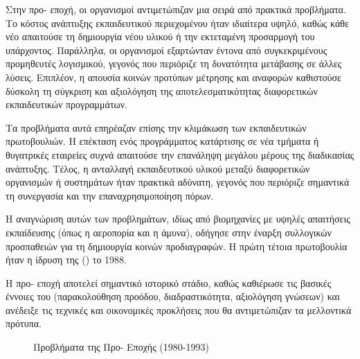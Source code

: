 Στην προ- εποχή, οι οργανισμοί αντιμετώπιζαν μια σειρά από πρακτικά προβλήματα. Το κόστος ανάπτυξης εκπαιδευτικού περιεχομένου ήταν ιδιαίτερα υψηλό, καθώς κάθε νέο  απαιτούσε τη δημιουργία νέου υλικού ή την εκτεταμένη προσαρμογή του υπάρχοντος. Παράλληλα, οι οργανισμοί εξαρτώνταν έντονα από συγκεκριμένους προμηθευτές λογισμικού, γεγονός που περιόριζε τη δυνατότητα μετάβασης σε άλλες λύσεις. Επιπλέον, η απουσία κοινών προτύπων μέτρησης και αναφορών καθιστούσε δύσκολη τη σύγκριση και αξιολόγηση της αποτελεσματικότητας διαφορετικών εκπαιδευτικών προγραμμάτων.

Τα προβλήματα αυτά επηρέαζαν επίσης την κλιμάκωση των εκπαιδευτικών πρωτοβουλιών. Η επέκταση ενός προγράμματος κατάρτισης σε νέα τμήματα ή θυγατρικές εταιρείες συχνά απαιτούσε την επανάληψη μεγάλου μέρους της διαδικασίας ανάπτυξης. Τέλος, η ανταλλαγή εκπαιδευτικού υλικού μεταξύ διαφορετικών οργανισμών ή συστημάτων ήταν πρακτικά αδύνατη, γεγονός που περιόριζε σημαντικά τη συνεργασία και την επαναχρησιμοποίηση πόρων.

Η αναγνώριση αυτών των προβλημάτων, ιδίως από βιομηχανίες με υψηλές απαιτήσεις εκπαίδευσης (όπως η αεροπορία και η άμυνα), οδήγησε στην έναρξη συλλογικών προσπαθειών για τη δημιουργία κοινών προδιαγραφών. Η πρώτη τέτοια πρωτοβουλία ήταν η ίδρυση της \textit{    } () το 1988.

Η προ- εποχή αποτελεί σημαντικό ιστορικό στάδιο, καθώς καθιέρωσε τις βασικές έννοιες του  (παρακολούθηση προόδου, διαδραστικότητα, αξιολόγηση γνώσεων) και ανέδειξε τις τεχνικές και οικονομικές προκλήσεις που θα αντιμετώπιζαν τα μελλοντικά πρότυπα.

\begin{figure}[H]
  \centering
  
  \caption{Προβλήματα της Προ- Εποχής (1980-1993)}
  \label{fig:pre_standard_problems}
\end{figure}
